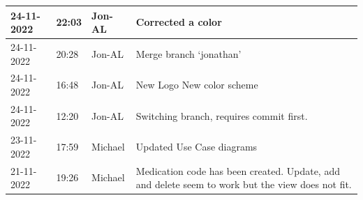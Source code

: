 \documentclass[11pt]{article}
\begin{document}
\begin{center}
\begin{longtable}{|p{2cm}|l|p{2cm}|p{10.5cm}|}
            24-11-2022                                 & 22:03                              & Jon-AL                                  & Corrected a color                                                                                                                                                                                                                                                                                            \\ \hline
            24-11-2022                                 & 20:28                              & Jon-AL                                  & Merge branch `jonathan'                                                                                                                                                                                                                                                                                      \\ \hline
            24-11-2022                                 & 16:48                              & Jon-AL                                  & New Logo New color scheme                                                                                                                                                                                                                                                                                    \\ \hline
            24-11-2022                                 & 12:20                              & Jon-AL                                  & Switching branch, requires commit first.                                                                                                                                                                                                                                                                     \\ \hline
            23-11-2022                                 & 17:59                              & Michael                                 & Updated Use Case diagrams                                                                                                                                                                                                                                                                                    \\ \hline
            21-11-2022                                 & 19:26                              & Michael                                 & Medication code has been created. Update, add and delete seem to work but the view does not fit.                                                                                                                                                                                                             \\ \hline

\end{longtable}
\end{center}
\end{document}
